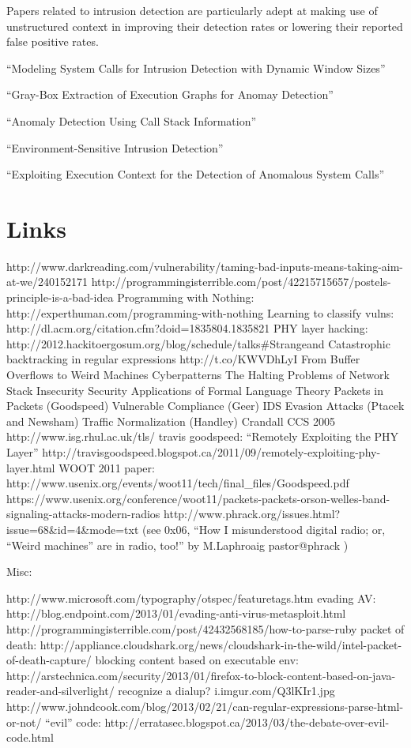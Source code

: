 \documentclass[acmcompsurv,acmnow]{acmtrans2m}
\begin{document}
Papers related to intrusion detection are particularly adept at making
use of unstructured context in improving their detection rates or
lowering their reported false positive rates.

``Modeling System Calls for Intrusion Detection with Dynamic Window Sizes''

``Gray-Box Extraction of Execution Graphs for Anomay Detection''

``Anomaly Detection Using Call Stack Information''

``Environment-Sensitive Intrusion Detection''

``Exploiting Execution Context for the Detection of Anomalous System Calls''



\section{Links}


    http://www.darkreading.com/vulnerability/taming-bad-inputs-means-taking-aim-at-we/240152171
    http://programmingisterrible.com/post/42215715657/postels-principle-is-a-bad-idea
    Programming with Nothing: http://experthuman.com/programming-with-nothing
    Learning to classify vulns: http://dl.acm.org/citation.cfm?doid=1835804.1835821
    PHY layer hacking: http://2012.hackitoergosum.org/blog/schedule/talks#Strangeand
    Catastrophic backtracking in regular expressions http://t.co/KWVDhLyI
    From Buffer Overflows to Weird Machines
    Cyberpatterns
    The Halting Problems of Network Stack Insecurity
    Security Applications of Formal Language Theory
    Packets in Packets (Goodspeed)
    Vulnerable Compliance (Geer)
    IDS Evasion Attacks (Ptacek and Newsham)
    Traffic Normalization (Handley)
    Crandall CCS 2005
    http://www.isg.rhul.ac.uk/tls/
    travis goodspeed: ``Remotely Exploiting the PHY Layer''
        http://travisgoodspeed.blogspot.ca/2011/09/remotely-exploiting-phy-layer.html
        WOOT 2011 paper: http://www.usenix.org/events/woot11/tech/final_files/Goodspeed.pdf
    https://www.usenix.org/conference/woot11/packets-packets-orson-welles-band-signaling-attacks-modern-radios
        http://www.phrack.org/issues.html?issue=68&id=4&mode=txt (see 0x06, ``How I misunderstood digital radio; or, ``Weird machines'' are in radio, too!'' by M.Laphroaig pastor@phrack )

Misc:

    http://www.microsoft.com/typography/otspec/featuretags.htm
    evading AV: http://blog.endpoint.com/2013/01/evading-anti-virus-metasploit.html
    http://programmingisterrible.com/post/42432568185/how-to-parse-ruby
    packet of death: http://appliance.cloudshark.org/news/cloudshark-in-the-wild/intel-packet-of-death-capture/
    blocking content based on executable env: http://arstechnica.com/security/2013/01/firefox-to-block-content-based-on-java-reader-and-silverlight/
    recognize a dialup? i.imgur.com/Q3lKIr1.jpg
    http://www.johndcook.com/blog/2013/02/21/can-regular-expressions-parse-html-or-not/
    ``evil'' code: http://erratasec.blogspot.ca/2013/03/the-debate-over-evil-code.html
\end{document}
